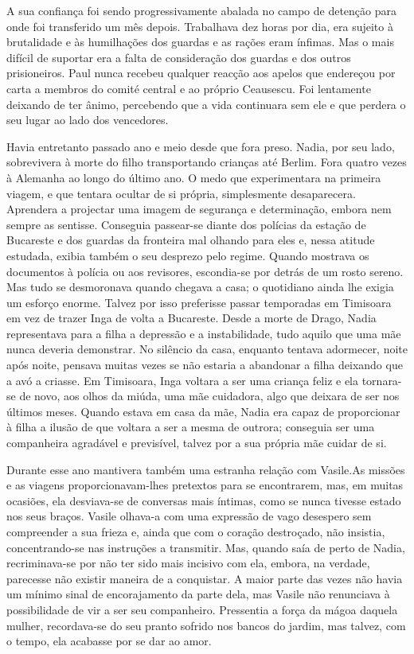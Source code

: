A sua confiança foi sendo progressivamente abalada no campo de detenção
para onde foi transferido um mês depois. Trabalhava dez horas por dia,
era sujeito à brutalidade e às humilhações dos guardas e as rações
eram ínfimas. Mas o mais difícil de suportar era a falta de consideração dos guardas e dos outros prisioneiros. Paul nunca recebeu
qualquer reacção aos apelos que endereçou por carta a membros do comité
central e ao próprio Ceausescu. Foi lentamente deixando de ter ânimo,
percebendo que a vida continuara sem ele e que perdera o seu lugar ao
lado dos vencedores.

Havia entretanto passado ano e meio desde que fora preso. Nadia, por seu
lado, sobrevivera à morte do filho transportando crianças até Berlim.
Fora quatro vezes à Alemanha ao longo do último ano. O medo que
experimentara na primeira viagem, e que tentara ocultar de si própria,
simplesmente desaparecera. Aprendera a projectar uma imagem de segurança
e determinação, embora nem sempre as sentisse. Conseguia passear-se
diante dos polícias da
estação de Bucareste e dos guardas da fronteira mal olhando para eles e,
nessa atitude estudada, exibia também o seu desprezo pelo regime. Quando
mostrava os documentos à polícia ou aos revisores, escondia-se por
detrás de um rosto sereno. Mas tudo se desmoronava quando chegava a
casa; o quotidiano ainda lhe exigia um esforço enorme. Talvez por isso
preferisse passar temporadas em Timisoara em vez de trazer Inga de volta
a Bucareste. Desde a morte de Drago, Nadia representava para a filha a
depressão e a instabilidade, tudo aquilo que uma mãe nunca deveria
demonstrar. No silêncio da casa, enquanto tentava adormecer, noite após
noite, pensava muitas vezes se não estaria a abandonar a filha deixando
que a avó a criasse. Em Timisoara, Inga voltara a ser uma criança feliz
e ela tornara-se de novo, aos olhos da miúda, uma mãe cuidadora, algo
que deixara de ser nos últimos meses. Quando estava em casa da mãe,
Nadia era capaz de proporcionar à filha a ilusão de que voltara a ser a
mesma de outrora; conseguia ser uma companheira agradável e
previsível, talvez por a sua própria mãe cuidar de si.

Durante esse ano mantivera também uma estranha
relação com Vasile.As missões e as viagens proporcionavam-lhes pretextos para se encontrarem, mas, em muitas ocasiões, ela
desviava-se de conversas mais íntimas, como se nunca tivesse estado nos
seus braços. Vasile olhava-a com uma expressão de vago desespero sem
compreender a sua frieza e, ainda que com o coração destroçado, não
insistia, concentrando-se nas instruções a transmitir. Mas, quando saía
de perto de Nadia, recriminava-se por não ter sido mais incisivo com
ela, embora, na verdade, parecesse não
existir maneira de a conquistar. A maior parte das vezes não havia um
mínimo sinal de encorajamento da parte dela, mas Vasile não renunciava à
possibilidade de vir a ser seu companheiro. Pressentia a força da mágoa
daquela mulher, recordava-se do seu pranto sofrido nos bancos do jardim,
mas talvez, com o tempo, ela acabasse por se dar ao amor.

